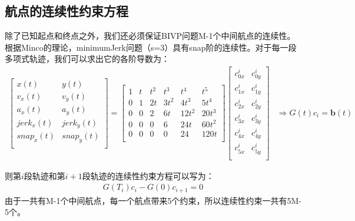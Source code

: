 \documentclass[master,academic]{ysuthesis} %
\begin{document}
		\subsection{航点的连续性约束方程} 
		除了已知起点和终点之外，我们还必须保证BIVP问题M-1个中间航点的连续性。根据Minco的理论，minimumJerk问题（s=3）具有snap阶的连续性。对于每一段多项式轨迹，我们可以求出它的各阶导数为：
		\begin{equation}
			\begin{aligned}
				\begin{bmatrix}
					x(t)& y(t)\\
					v_x(t)& v_y(t)\\
					a_x(t)& a_y(t)\\
					jerk_x(t)& jerk_y(t)\\
					snap_x(t)& snap_y(t)\\
				\end{bmatrix}
					= \begin{bmatrix}
					1&		t&		t^2&		t^3&		t^4&		t^5\\
					0&		1&		2t&		3t^2&		4t^3&		5t^4\\
					0&		0&		2&		6t&		12t^2&		20t^3\\
					0&		0&		0&		6&		24t&		60t^2\\
					0&		0&		0&		0&		24&		120t\\
				\end{bmatrix}  \begin{bmatrix}
					c_{0x}^{i}&		c_{0y}^{i}\\
					c_{1x}^{i}&		c_{1y}^{i}\\
					c_{2x}^{i}&		c_{2y}^{i}\\
					c_{3x}^{i}&		c_{3y}^{i}\\
					c_{4x}^{i}&		c_{4y}^{i}\\
					c_{5x}^{i}&		c_{5y}^{i}\\
				\end{bmatrix}
				&\Longrightarrow G(t) c_i=\mathbf{b}(t) 
			\end{aligned}
		\end{equation}
		
		则第$i$段轨迹和第$i+1$段轨迹的连续性约束方程可以写为：
		\begin{equation}
			\begin{aligned}
				G(T_i)c_i-G(0)c_{i+1} = 0
			\end{aligned}
		\end{equation}
		由于一共有M-1个中间航点，每一个航点带来5个约束，所以连续性约束一共有5M-5个。
		
\end{document}
